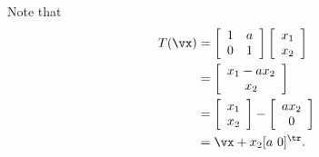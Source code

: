 \ActivitySolution
\ba
\item Note that 
\begin{align*}
T(\vx) &= \left[ \begin{array}{cc} 1&a\\0&1 \end{array} \right] \left[ \begin{array}{c} x_1\\x_2 \end{array} \right] \\
	&= \left[ \begin{array}{c} x_1-ax_2\\x_2 \end{array} \right] \\
	&= \left[ \begin{array}{c} x_1\\x_2 \end{array} \right]  - \left[ \begin{array}{c} ax_2\\0 \end{array} \right] \\
	&=\vx + x_2[a \ 0]^{\tr}.
\end{align*}


